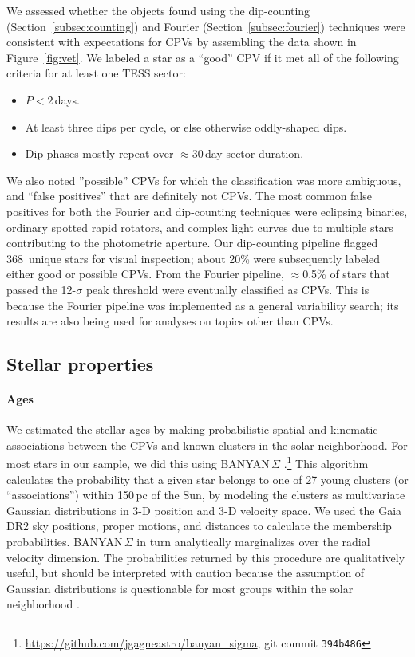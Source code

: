 \documentclass[11pt,twocolumn,tighten]{aastex63}
\newcommand{\nuniqdipflagged}{{368}} %
\begin{document}
We assessed whether the objects found using the dip-counting
(Section~\ref{subsec:counting}) and Fourier
(Section~\ref{subsec:fourier}) techniques were consistent with
expectations for CPVs by assembling the data shown in
Figure~\ref{fig:vet}.  We labeled a star as a ``good'' CPV if it met
all of the following criteria for at least one TESS sector:
\vspace{-2pt}
\begin{itemize}[leftmargin=*]
  \setlength\itemsep{-2pt}
  \item $P<2$\,days.
  \item At least three dips per cycle, or else otherwise
    oddly-shaped dips.
  \item Dip phases mostly repeat over $\approx$30\,day sector duration.
\end{itemize}
\vspace{-2pt}
We also noted ''possible'' CPVs for which the classification was more
ambiguous, and ``false positives'' that are definitely not CPVs.  The
most common false positives for both the Fourier and dip-counting
techniques were eclipsing binaries, ordinary spotted rapid rotators,
and complex light curves due to multiple stars contributing to the
photometric aperture.  Our dip-counting pipeline flagged
\nuniqdipflagged\ unique stars for visual inspection; about 20\% were
subsequently labeled either good or possible CPVs.  From the Fourier
pipeline, $\approx$0.5\% of stars that passed the 12-$\sigma$ peak
threshold were eventually classified as CPVs.  This is because the
Fourier pipeline was implemented as a general variability search; its
results are also being used for analyses on topics other than CPVs.



\subsection{Stellar properties}
\label{subsec:starprops}

\paragraph{Ages}
We estimated the stellar ages by making probabilistic spatial and
kinematic associations between the CPVs and known clusters in the solar
neighborhood.  For most stars in our sample, we did this using
BANYAN\,$\Sigma$
\citep{2018ApJ...856...23G}.\footnote{\url{https://github.com/jgagneastro/banyan_sigma},
git commit \texttt{394b486}} This algorithm calculates the probability
that a given star belongs to one of 27 young clusters (or
``associations'') within 150\,pc of the Sun, by modeling the clusters
as multivariate Gaussian distributions in 3-D position and 3-D
velocity space.  We used the Gaia DR2 sky positions, proper motions,
and distances to calculate the membership probabilities.
BANYAN\,$\Sigma$ in turn analytically marginalizes over the radial
velocity dimension.  The probabilities returned by this procedure are
qualitatively useful, but should be interpreted with caution because
the assumption of Gaussian distributions is questionable for most
groups within the solar neighborhood \citep[see
e.g.][Figure~10]{2021ApJ...917...23K}.
\end{document}
